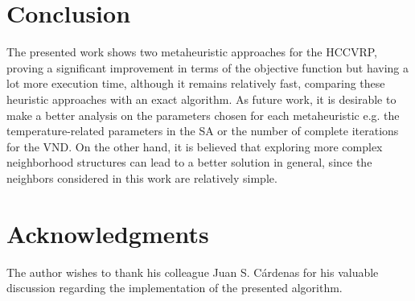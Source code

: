 \documentclass[10pt,twoside]{article}
\begin{document}
\section{Conclusion}
The presented work shows two metaheuristic approaches for the HCCVRP, proving a significant improvement in terms of the objective function but having a lot more execution time, although it remains relatively fast, comparing these heuristic approaches with an exact algorithm. As future work, it is desirable to make a better analysis on the parameters chosen for each metaheuristic e.g. the temperature-related parameters in the SA or the number of complete iterations for the VND. On the other hand, it is believed that exploring more complex neighborhood structures can lead to a better solution in general, since the neighbors considered in this work are relatively simple.



\section*{Acknowledgments}
The author wishes to thank his colleague Juan S. Cárdenas for his valuable discussion regarding the implementation of the presented algorithm.


{\small


}
\end{document}
